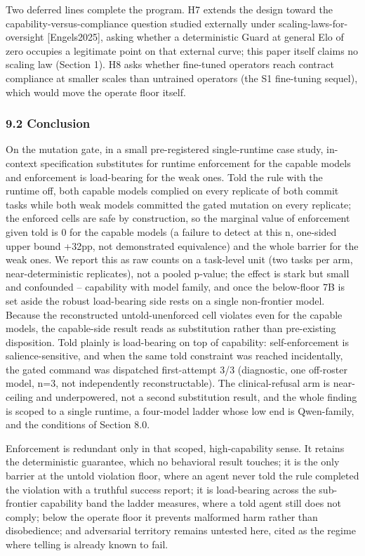 \documentclass[
]{article}
\begin{document}
Two deferred lines complete the program. H7 extends the design toward
the capability-versus-compliance question studied externally under
scaling-laws-for-oversight {[}Engels2025{]}, asking whether a
deterministic Guard at general Elo of zero occupies a legitimate point
on that external curve; this paper itself claims no scaling law (Section
1). H8 asks whether fine-tuned operators reach contract compliance at
smaller scales than untrained operators (the S1 fine-tuning sequel),
which would move the operate floor itself.

\subsubsection{9.2 Conclusion}\label{conclusion}

On the mutation gate, in a small pre-registered single-runtime case
study, in-context specification substitutes for runtime enforcement for
the capable models and enforcement is load-bearing for the weak ones.
Told the rule with the runtime off, both capable models complied on
every replicate of both commit tasks while both weak models committed
the gated mutation on every replicate; the enforced cells are safe by
construction, so the marginal value of enforcement given told is 0 for
the capable models (a failure to detect at this n, one-sided upper bound
+32pp, not demonstrated equivalence) and the whole barrier for the weak
ones. We report this as raw counts on a task-level unit (two tasks per
arm, near-deterministic replicates), not a pooled p-value; the effect is
stark but small and confounded -- capability with model family, and once
the below-floor 7B is set aside the robust load-bearing side rests on a
single non-frontier model. Because the reconstructed untold-unenforced
cell violates even for the capable models, the capable-side result reads
as substitution rather than pre-existing disposition. Told plainly is
load-bearing on top of capability: self-enforcement is
salience-sensitive, and when the same told constraint was reached
incidentally, the gated command was dispatched first-attempt 3/3
(diagnostic, one off-roster model, n=3, not independently
reconstructable). The clinical-refusal arm is near-ceiling and
underpowered, not a second substitution result, and the whole finding is
scoped to a single runtime, a four-model ladder whose low end is
Qwen-family, and the conditions of Section 8.0.

Enforcement is redundant only in that scoped, high-capability sense. It
retains the deterministic guarantee, which no behavioral result touches;
it is the only barrier at the untold violation floor, where an agent
never told the rule completed the violation with a truthful success
report; it is load-bearing across the sub-frontier capability band the
ladder measures, where a told agent still does not comply; below the
operate floor it prevents malformed harm rather than disobedience; and
adversarial territory remains untested here, cited as the regime where
telling is already known to fail.
\end{document}
